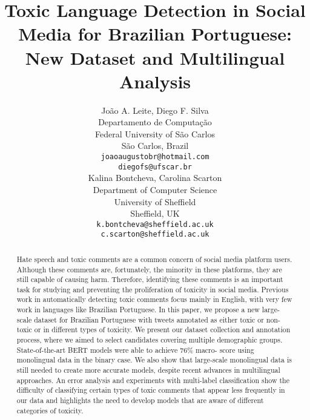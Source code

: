 \documentclass[11pt,a4paper]{article}
\title{Toxic Language Detection in Social Media for Brazilian Portuguese:\\ New Dataset and Multilingual Analysis}
\author{João A. Leite, Diego F. Silva \\
  Departamento de Computação \\
  Federal University of São Carlos \\
  São Carlos, Brazil \\
  \texttt{joaoaugustobr@hotmail.com} \\
  \texttt{diegofs@ufscar.br} \\ \And
  Kalina Bontcheva, Carolina Scarton \\
  Department of Computer Science \\
  University of Sheffield \\
  Sheffield, UK \\
  \texttt{k.bontcheva@sheffield.ac.uk} \\
  \texttt{c.scarton@sheffield.ac.uk}\\}
\date{}
\begin{document}
\maketitle
\begin{abstract}
Hate speech and toxic comments are a common concern of social media platform users. Although these comments are, fortunately, the minority in these platforms, they are still capable of causing harm. Therefore, identifying these comments is an important task for studying and preventing the proliferation of toxicity in social media. Previous work in automatically detecting toxic comments focus mainly in English, with very few work in languages like Brazilian Portuguese. In this paper, we propose a new large-scale dataset for Brazilian Portuguese with tweets annotated as either toxic or non-toxic or in different types of toxicity. We present our dataset collection and annotation process, where we aimed to select candidates covering multiple demographic groups. State-of-the-art BERT models were able to achieve 76\% macro- score using monolingual data in the binary case. We also show that large-scale monolingual data is still needed to create more accurate models, despite recent advances in multilingual approaches. An error analysis and experiments with multi-label classification show the difficulty of classifying certain types of toxic comments that appear less frequently in our data and highlights the need to develop models that are aware of different categories of toxicity. 
\end{abstract}
\end{document}
